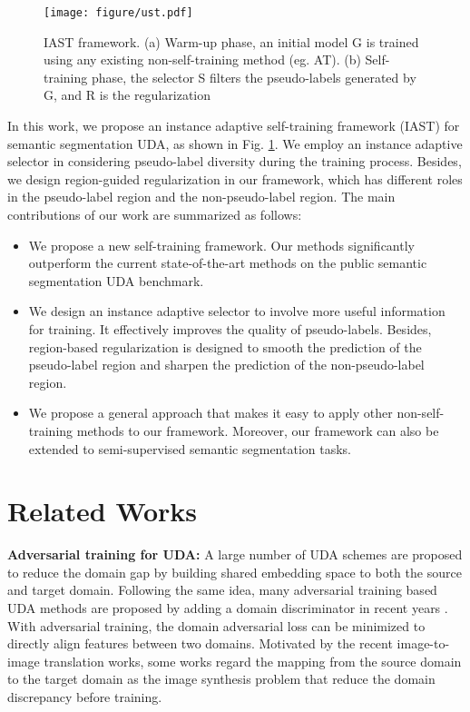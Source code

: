 \documentclass[runningheads]{llncs}
\begin{document}
 



\begin{figure}[ht] 
    \centering 
    \texttt{[image: figure/ust.pdf]} 
    \caption{IAST framework. (a) Warm-up phase, an initial model G is trained using any existing non-self-training method (eg. AT). (b) Self-training phase, the selector S filters the pseudo-labels generated by G, and R is the regularization }
    \label{fig:ust} 
\end{figure}

In this work, we propose an instance adaptive self-training framework (IAST) for semantic segmentation UDA, as shown in Fig. \ref{fig:ust}. We employ an instance adaptive selector in considering pseudo-label diversity during the training process. Besides, we design region-guided regularization in our framework, which has different roles in the pseudo-label region and the non-pseudo-label region. The main contributions of our work are summarized as follows:

\begin{itemize}
\item We propose a new self-training framework. Our methods significantly outperform the current state-of-the-art methods on the public semantic segmentation UDA benchmark.

\item We design an instance adaptive selector to involve more useful information for training. It effectively improves the quality of pseudo-labels. Besides, region-based regularization is designed to smooth the prediction of the pseudo-label region and sharpen the prediction of the non-pseudo-label region. 

\item We propose a general approach that makes it easy to apply other non-self-training methods to our framework. Moreover, our framework can also be extended to semi-supervised semantic segmentation tasks.
\end{itemize} 
\section{Related Works}
\noindent\textbf{Adversarial training for UDA:} A large number of UDA schemes \cite{baktashmotlagh2013unsupervised,kan2015bi,lee2019sliced,li2018multi} are proposed to reduce the domain gap by building shared embedding space to both the source and target domain. Following the same idea, many adversarial training based UDA methods are proposed by adding a domain discriminator in recent years \cite{tsai2018learning,huang2018multimodal,long2018conditional,du2019ssf,vu2019advent,zhao2017self,zhao2018towards}. With adversarial training, the domain adversarial loss can be minimized to directly align features between two domains. Motivated by the recent image-to-image translation works, some works \cite{hoffman2018cycada,li2019bidirectional} regard the mapping from the source domain to the target domain as the image synthesis problem that reduce the domain discrepancy before training.
\end{document}
